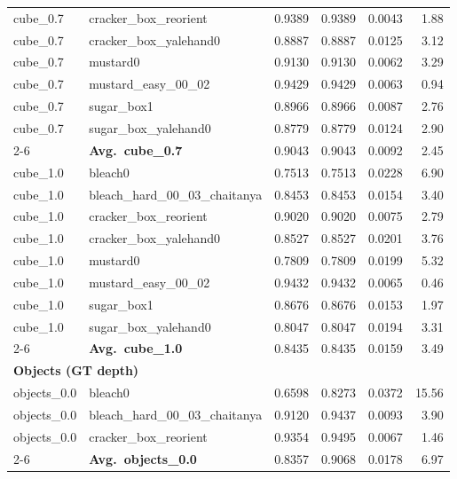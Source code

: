 \begin{longtable}{llrrrr}
  cube_0.7 & cracker\_box\_reorient & 0.9389 & 0.9389 & 0.0043 & 1.88 \\
  cube_0.7 & cracker\_box\_yalehand0 & 0.8887 & 0.8887 & 0.0125 & 3.12 \\
  cube_0.7 & mustard0 & 0.9130 & 0.9130 & 0.0062 & 3.29 \\
  cube_0.7 & mustard\_easy\_00\_02 & 0.9429 & 0.9429 & 0.0063 & 0.94 \\
  cube_0.7 & sugar\_box1 & 0.8966 & 0.8966 & 0.0087 & 2.76 \\
  cube_0.7 & sugar\_box\_yalehand0 & 0.8779 & 0.8779 & 0.0124 & 2.90 \\
  \cmidrule{2-6}
  & \textbf{Avg.~cube_0.7} & 0.9043 & 0.9043 & 0.0092 & 2.45 \\
  \midrule
  cube_1.0 & bleach0 & 0.7513 & 0.7513 & 0.0228 & 6.90 \\
  cube_1.0 & bleach\_hard\_00\_03\_chaitanya & 0.8453 & 0.8453 & 0.0154 & 3.40 \\
  cube_1.0 & cracker\_box\_reorient & 0.9020 & 0.9020 & 0.0075 & 2.79 \\
  cube_1.0 & cracker\_box\_yalehand0 & 0.8527 & 0.8527 & 0.0201 & 3.76 \\
  cube_1.0 & mustard0 & 0.7809 & 0.7809 & 0.0199 & 5.32 \\
  cube_1.0 & mustard\_easy\_00\_02 & 0.9432 & 0.9432 & 0.0065 & 0.46 \\
  cube_1.0 & sugar\_box1 & 0.8676 & 0.8676 & 0.0153 & 1.97 \\
  cube_1.0 & sugar\_box\_yalehand0 & 0.8047 & 0.8047 & 0.0194 & 3.31 \\
  \cmidrule{2-6}
  & \textbf{Avg.~cube_1.0} & 0.8435 & 0.8435 & 0.0159 & 3.49 \\
  \midrule
\multicolumn{6}{l}{\textbf{Objects (GT depth)}} \\
\midrule
  objects_0.0 & bleach0 & 0.6598 & 0.8273 & 0.0372 & 15.56 \\
  objects_0.0 & bleach\_hard\_00\_03\_chaitanya & 0.9120 & 0.9437 & 0.0093 & 3.90 \\
  objects_0.0 & cracker\_box\_reorient & 0.9354 & 0.9495 & 0.0067 & 1.46 \\
  \cmidrule{2-6}
  & \textbf{Avg.~objects_0.0} & 0.8357 & 0.9068 & 0.0178 & 6.97 \\
  \midrule
\bottomrule
\end{longtable}